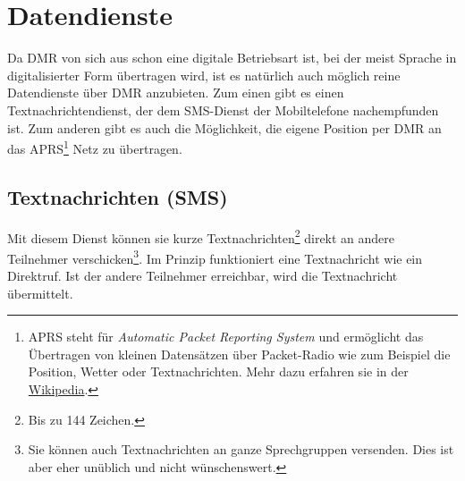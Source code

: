 \section{Datendienste} \label{sec:data}
Da DMR von sich aus schon eine digitale Betriebsart ist, bei der meist Sprache in digitalisierter Form übertragen wird, ist es natürlich auch möglich reine Datendienste über DMR anzubieten. Zum einen gibt es einen Textnachrichtendienst, der dem SMS-Dienst der Mobiltelefone nachempfunden ist. Zum anderen gibt es auch die Möglichkeit, die eigene Position per DMR an das APRS\footnote{APRS steht für \emph{Automatic Packet Reporting System} und ermöglicht das Übertragen von kleinen Datensätzen über Packet-Radio wie zum Beispiel die Position, Wetter oder Textnachrichten. Mehr dazu erfahren sie in der \href{https://de.wikipedia.org/wiki/Automatic_Packet_Reporting_System}{Wikipedia}.} Netz zu übertragen.
 
\subsection{Textnachrichten (SMS)} \label{sec:textmsg}
Mit diesem Dienst können sie kurze Textnachrichten\footnote{Bis zu 144 Zeichen.} direkt an andere Teilnehmer verschicken\footnote{Sie können auch Textnachrichten an ganze Sprechgruppen versenden. Dies ist aber eher unüblich und nicht wünschenswert.}. Im Prinzip funktioniert eine Textnachricht wie ein Direktruf. Ist der andere Teilnehmer erreichbar, wird die Textnachricht übermittelt. 

